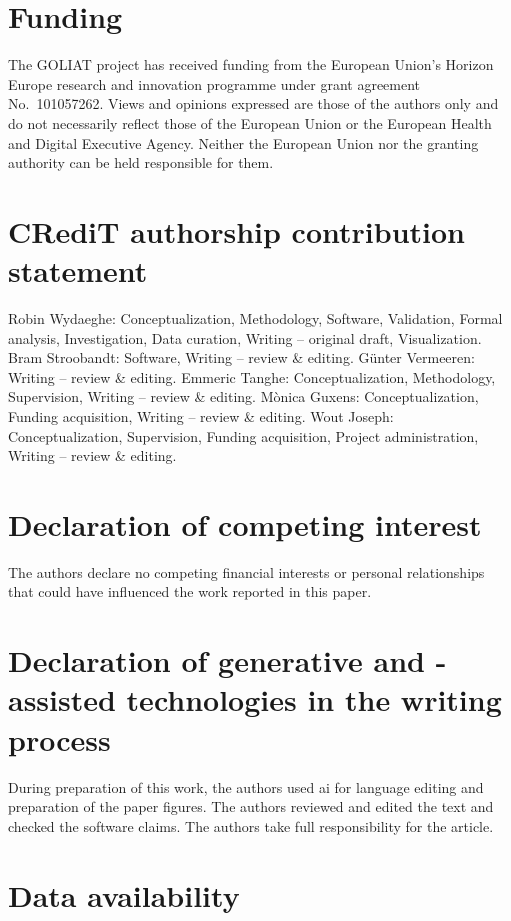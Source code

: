 \documentclass[final,5p,times,twocolumn]{elsarticle}
\begin{document}
\section*{Funding}

The GOLIAT project has received funding from the European Union's Horizon Europe research and innovation programme under grant agreement No.~101057262. Views and opinions expressed are those of the authors only and do not necessarily reflect those of the European Union or the European Health and Digital Executive Agency. Neither the European Union nor the granting authority can be held responsible for them.

\section*{CRediT authorship contribution statement}

Robin Wydaeghe: Conceptualization, Methodology, Software, Validation, Formal analysis, Investigation, Data curation, Writing -- original draft, Visualization. Bram Stroobandt: Software, Writing -- review \& editing. G{\"u}nter Vermeeren: Writing -- review \& editing. Emmeric Tanghe: Conceptualization, Methodology, Supervision, Writing -- review \& editing. M{\`o}nica Guxens: Conceptualization, Funding acquisition, Writing -- review \& editing. Wout Joseph: Conceptualization, Supervision, Funding acquisition, Project administration, Writing -- review \& editing.

\section*{Declaration of competing interest}

The authors declare no competing financial interests or personal relationships that could have influenced the work reported in this paper.

\section*{Declaration of generative  and -assisted technologies in the writing process}

During preparation of this work, the authors used \gls{ai} for language editing and preparation of the paper figures. The authors reviewed and edited the text and checked the software claims. The authors take full responsibility for the article.

\section*{Data availability}
\end{document}
